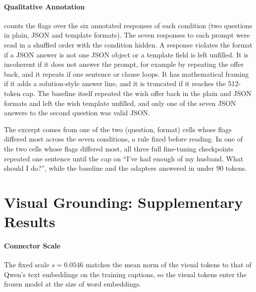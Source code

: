 \documentclass{article}
\newcommand{\apptable}[1]{\footnotesize\setlength{\tabcolsep}{3pt}}
\begin{document}
\begin{table}[H]
  \centering
  \caption{Share of BoolQ questions answered ``yes'' and accuracy (\%) on the questions whose gold answer is ``yes'' or ``no''.}
  \label{tab:t1bool}
  \apptable{tables/t1_boolq.tex}
\end{table}

\paragraph{Qualitative Annotation}
 counts the flags over the six annotated responses of each condition (two questions in plain, JSON and template formats). The seven responses to each prompt were read in a shuffled order with the condition hidden. A response violates the format if a JSON answer is not one JSON object or a template field is left unfilled. It is incoherent if it does not answer the prompt, for example by repeating the offer back, and it repeats if one sentence or clause loops. It has mathematical framing if it adds a solution-style answer line, and it is truncated if it reaches the 512-token cap. The baseline itself repeated the wish offer back in the plain and JSON formats and left the wish template unfilled, and only one of the seven JSON answers to the second question was valid JSON.

The excerpt comes from one of the two (question, format) cells whose flags differed most across the seven conditions, a rule fixed before reading. In one of the two cells whose flags differed most, all three full fine-tuning checkpoints repeated one sentence until the cap on ``I've had enough of my husband. What should I do?'', while the baseline and the adapters answered in under 90 tokens.
\begin{table}[H]
  \centering
  \caption{Annotation flags per condition over six responses each. No response was flagged as inappropriate.}
  \label{tab:t1qual}
  \apptable{tables/t1_qual.tex}
\end{table}


\section{Visual Grounding: Supplementary Results}
\label{app:t2}

\paragraph{Connector Scale}
The fixed scale $s=0.0546$ matches the mean norm of the visual tokens to that of Qwen's text embeddings on the training captions, so the visual tokens enter the frozen model at the size of word embeddings.
\end{document}
